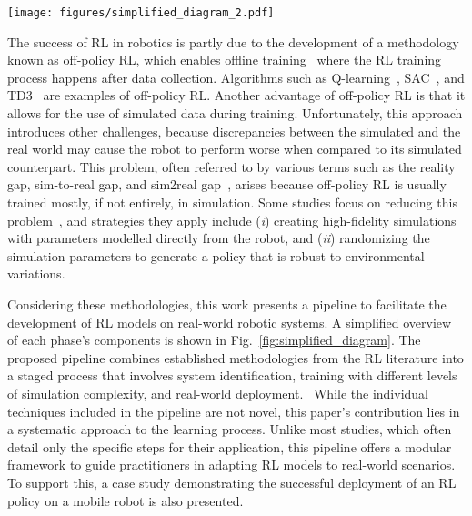 \begin{figure*}
    \centering
    \texttt{[image: figures/simplified\_diagram\_2.pdf]}
    \caption{Simplified diagram describing the components of the proposed RL pipeline. Each component is optional, and the combination of the stages depends on the problem's complexity. 
    }
    \label{fig:simplified_diagram}
\end{figure*}

The success of RL in robotics is partly due to the development of a methodology known as off-policy RL, which enables offline training~\cite{levine2020offline} where the RL training process happens after data collection. Algorithms such as Q-learning~\cite{sutton2018reinforcement}, SAC~\cite{haarnoja2018soft}, and TD3~\cite{fujimoto2018addressing} are examples of off-policy RL. Another advantage of off-policy RL is that it allows for the use of simulated data during training. Unfortunately, this approach introduces other challenges, because discrepancies between the simulated and the real world may cause the robot to perform worse when compared to its simulated counterpart. This problem, often referred to by various terms such as the reality gap, sim-to-real gap, and sim2real gap~\cite{jakobi1995noise}, arises because off-policy RL is usually trained mostly, if not entirely, in simulation. Some studies focus on reducing this problem~\cite{chebotar2019closing, calderon2024deep, zhao2020sim}, and strategies they apply include (\textit{i}) creating high-fidelity simulations with parameters modelled directly from the robot, and (\textit{ii}) randomizing the simulation parameters to generate a policy that is robust to environmental variations. %

Considering these methodologies, this work presents a pipeline to facilitate the development of RL models on real-world robotic systems. %
A simplified overview of each phase's components is shown in Fig.\ \ref{fig:simplified_diagram}. %
The proposed pipeline combines established methodologies from the RL literature into a staged process that involves system identification, training with different levels of simulation complexity, and real-world deployment. 
~While the individual techniques included in the pipeline are not novel, this paper's contribution lies in a systematic approach to the learning process. Unlike most studies, which often detail only the specific steps for their application, this pipeline offers a modular framework to guide practitioners in adapting RL models to real-world scenarios. To support this, a case study demonstrating the successful deployment of an RL policy on a mobile robot is also presented.

